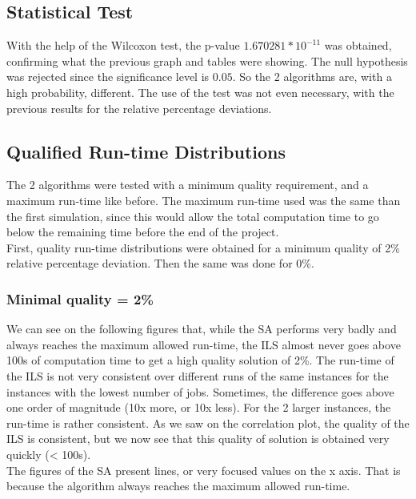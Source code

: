 \subsection{Statistical Test}

With the help of the Wilcoxon test, the p-value $1.670281*10^{-11}$ was obtained, confirming what the previous graph and tables were showing. The null hypothesis was rejected since the significance level is $0.05$. So the 2 algorithms are, with a high probability, different. The use of the test was not even necessary, with the previous results for the relative percentage deviations.

\subsection{Qualified Run-time Distributions}

The 2 algorithms were tested with a minimum quality requirement, and a maximum run-time like before. The maximum run-time used was the same than the first simulation, since this would allow the total computation time to go below the remaining time before the end of the project.\\

First, quality run-time distributions were obtained for a minimum quality of 2\% relative percentage deviation. Then the same was done for 0\%.

\subsubsection{Minimal quality = 2\%}

We can see on the following figures that, while the SA performs very badly and always reaches the maximum allowed run-time, the ILS almost never goes above 100s of computation time to get a high quality solution of 2\%. The run-time of the ILS is not very consistent over different runs of the same instances for the instances with the lowest number of jobs. Sometimes, the difference goes above one order of magnitude (10x more, or 10x less). For the 2 larger instances, the run-time is rather consistent. As we saw on the correlation plot, the quality of the ILS is consistent, but we now see that this quality of solution is obtained very quickly (< 100s).\\

The figures of the SA present lines, or very focused values on the x axis. That is because the algorithm always reaches the maximum allowed run-time.

